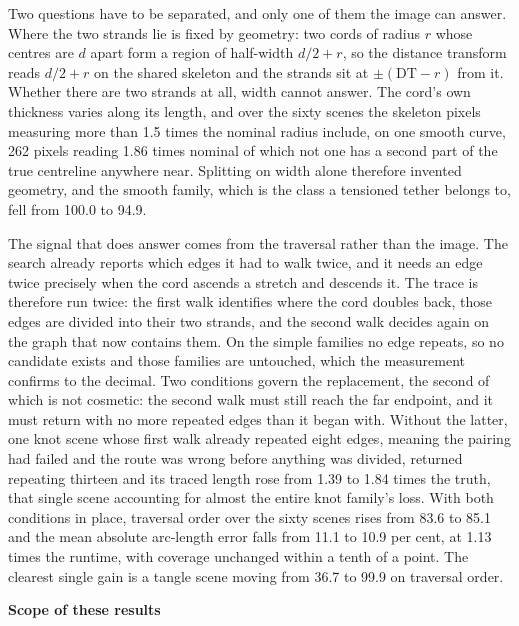 Two questions have to be separated, and only one of them the image can answer. Where the two strands lie is fixed by geometry: two cords of radius $r$ whose centres are $d$ apart form a region of half-width $d/2 + r$, so the distance transform reads $d/2 + r$ on the shared skeleton and the strands sit at $\pm(\mathrm{DT} - r)$ from it. Whether there are two strands at all, width cannot answer. The cord's own thickness varies along its length, and over the sixty scenes the skeleton pixels measuring more than 1.5 times the nominal radius include, on one smooth curve, 262 pixels reading 1.86 times nominal of which not one has a second part of the true centreline anywhere near. Splitting on width alone therefore invented geometry, and the smooth family, which is the class a tensioned tether belongs to, fell from 100.0 to 94.9.

The signal that does answer comes from the traversal rather than the image. The search already reports which edges it had to walk twice, and it needs an edge twice precisely when the cord ascends a stretch and descends it. The trace is therefore run twice: the first walk identifies where the cord doubles back, those edges are divided into their two strands, and the second walk decides again on the graph that now contains them. On the simple families no edge repeats, so no candidate exists and those families are untouched, which the measurement confirms to the decimal. Two conditions govern the replacement, the second of which is not cosmetic: the second walk must still reach the far endpoint, and it must return with no more repeated edges than it began with. Without the latter, one knot scene whose first walk already repeated eight edges, meaning the pairing had failed and the route was wrong before anything was divided, returned repeating thirteen and its traced length rose from 1.39 to 1.84 times the truth, that single scene accounting for almost the entire knot family's loss. With both conditions in place, traversal order over the sixty scenes rises from 83.6 to 85.1 and the mean absolute arc-length error falls from 11.1 to 10.9 per cent, at 1.13 times the runtime, with coverage unchanged within a tenth of a point. The clearest single gain is a tangle scene moving from 36.7 to 99.9 on traversal order.


\vspace{0.2cm}
\noindent \textbf{Scope of these results}
\vspace{0.2cm}


